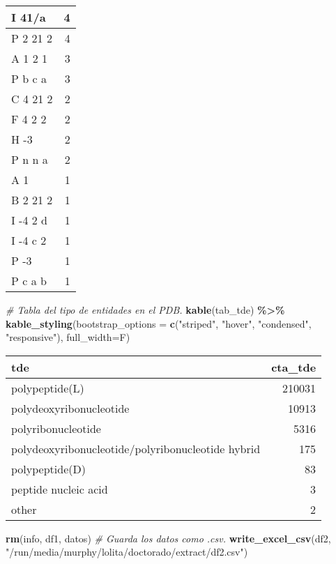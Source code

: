 \documentclass[
]{book}
\newenvironment{Shaded}{\begin{snugshade}}{\end{snugshade}}
\newcommand{\CommentTok}[1]{\textcolor[rgb]{0.56,0.35,0.01}{\textit{#1}}}
\newcommand{\DataTypeTok}[1]{\textcolor[rgb]{0.13,0.29,0.53}{#1}}
\newcommand{\KeywordTok}[1]{\textcolor[rgb]{0.13,0.29,0.53}{\textbf{#1}}}
\newcommand{\NormalTok}[1]{#1}
\newcommand{\OperatorTok}[1]{\textcolor[rgb]{0.81,0.36,0.00}{\textbf{#1}}}
\newcommand{\StringTok}[1]{\textcolor[rgb]{0.31,0.60,0.02}{#1}}
\begin{document}
\begin{table}[H]
\begin{tabular}{l|r}
\hline
I 41/a & 4\\
\hline
P 2 21 2 & 4\\
\hline
A 1 2 1 & 3\\
\hline
P b c a & 3\\
\hline
C 4 21 2 & 2\\
\hline
F 4 2 2 & 2\\
\hline
H -3 & 2\\
\hline
P n n a & 2\\
\hline
A 1 & 1\\
\hline
B 2 21 2 & 1\\
\hline
I -4 2 d & 1\\
\hline
I -4 c 2 & 1\\
\hline
P -3 & 1\\
\hline
P c a b & 1\\
\hline
\end{tabular}
\end{table}

\begin{Shaded}
\begin{Highlighting}[]
\CommentTok{\# Tabla del tipo de entidades en el PDB.}
\KeywordTok{kable}\NormalTok{(tab\_tde) }\OperatorTok{\%\textgreater{}\%}
\StringTok{  }\KeywordTok{kable\_styling}\NormalTok{(}\DataTypeTok{bootstrap\_options =} \KeywordTok{c}\NormalTok{(}\StringTok{"striped"}\NormalTok{, }\StringTok{"hover"}\NormalTok{, }\StringTok{"condensed"}\NormalTok{, }\StringTok{"responsive"}\NormalTok{), }\DataTypeTok{full\_width=}\NormalTok{F)}
\end{Highlighting}
\end{Shaded}

\begin{table}[H]
\centering
\begin{tabular}{l|r}
\hline
tde & cta\_tde\\
\hline
polypeptide(L) & 210031\\
\hline
polydeoxyribonucleotide & 10913\\
\hline
polyribonucleotide & 5316\\
\hline
polydeoxyribonucleotide/polyribonucleotide hybrid & 175\\
\hline
polypeptide(D) & 83\\
\hline
peptide nucleic acid & 3\\
\hline
other & 2\\
\hline
\end{tabular}
\end{table}

\begin{Shaded}
\begin{Highlighting}[]
\KeywordTok{rm}\NormalTok{(info, df1, datos)}
\CommentTok{\# Guarda los datos como \textasciigrave{}.csv\textasciigrave{}.}
\KeywordTok{write\_excel\_csv}\NormalTok{(df2, }\StringTok{"/run/media/murphy/lolita/doctorado/extract/df2.csv"}\NormalTok{)}
\end{Highlighting}
\end{Shaded}
\end{document}
